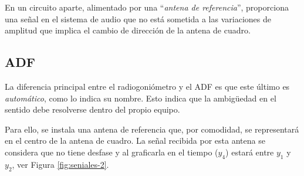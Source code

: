En un circuito aparte, alimentado por una ``\emph{antena de referencia}'', proporciona una se\~nal en el sistema de audio que no est\'a sometida a las variaciones de amplitud que implica el cambio de direcci\'on de la antena de cuadro.



\subsection{ADF}

La diferencia principal entre el radiogoni\'ometro y el ADF es que este \'ultimo es \emph{autom\'atico}, como lo indica su nombre. Esto indica que la ambigüedad en el sentido debe resolverse dentro del propio equipo.

Para ello, se instala una antena de referencia que, por comodidad, se representar\'a en el centro de la antena de cuadro. La se\~nal recibida por esta antena se considera que no tiene desfase y al graficarla en el tiempo ($y_4$) estar\'a entre $y_1$ y $y_2$, ver Figura \ref{fig:seniales-2}.


